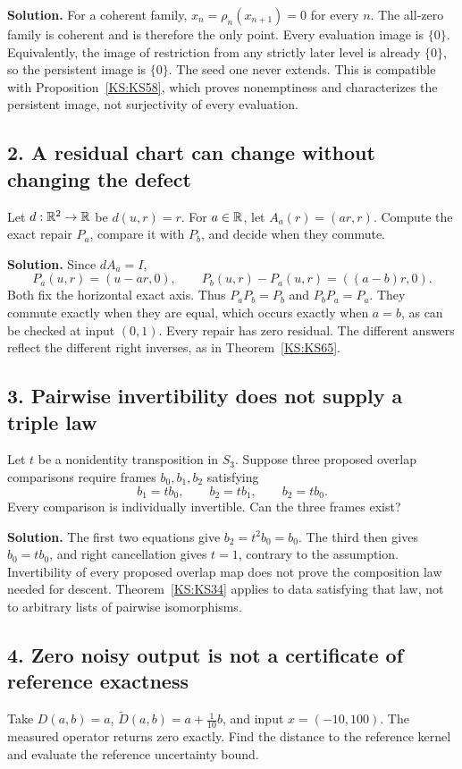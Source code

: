 \documentclass[11pt,oneside,openany]{book}
\numberwithin{equation}{section}
\begin{document}
\textbf{Solution.} For a coherent family, \(x_n=\rho_n(x_{n+1})=0\) for every \(n\). The all-zero family is coherent and is therefore the only point. Every evaluation image is \(\{0\}\). Equivalently, the image of restriction from any strictly later level is already \(\{0\}\), so the persistent image is \(\{0\}\). The seed one never extends. This is compatible with Proposition~\ref{KS:KS58}, which proves nonemptiness and characterizes the persistent image, not surjectivity of every evaluation.

\subsection*{2. A residual chart can change without changing the defect}
Let \(d:\mathbb R^2\to\mathbb R\) be \(d(u,r)=r\). For \(a\in\mathbb R\), let \(A_a(r)=(ar,r)\). Compute the exact repair \(P_a\), compare it with \(P_b\), and decide when they commute.

\textbf{Solution.} Since \(dA_a=I\),
\[
 P_a(u,r)=(u-ar,0),\qquad
 P_b(u,r)-P_a(u,r)=((a-b)r,0).
\]
Both fix the horizontal exact axis. Thus \(P_aP_b=P_b\) and \(P_bP_a=P_a\). They commute exactly when they are equal, which occurs exactly when \(a=b\), as can be checked at input \((0,1)\). Every repair has zero residual. The different answers reflect the different right inverses, as in Theorem~\ref{KS:KS65}.

\subsection*{3. Pairwise invertibility does not supply a triple law}
Let \(t\) be a nonidentity transposition in \(S_3\). Suppose three proposed overlap comparisons require frames \(b_0,b_1,b_2\) satisfying
\[
 b_1=tb_0,\qquad b_2=tb_1,\qquad b_2=tb_0.
\]
Every comparison is individually invertible. Can the three frames exist?

\textbf{Solution.} The first two equations give \(b_2=t^2b_0=b_0\). The third then gives \(b_0=tb_0\), and right cancellation gives \(t=1\), contrary to the assumption. Invertibility of every proposed overlap map does not prove the composition law needed for descent. Theorem~\ref{KS:KS34} applies to data satisfying that law, not to arbitrary lists of pairwise isomorphisms.

\subsection*{4. Zero noisy output is not a certificate of reference exactness}
Take \(D(a,b)=a\), \(\widetilde D(a,b)=a+\tfrac1{10}b\), and input \(x=(-10,100)\). The measured operator returns zero exactly. Find the distance to the reference kernel and evaluate the reference uncertainty bound.
\end{document}
